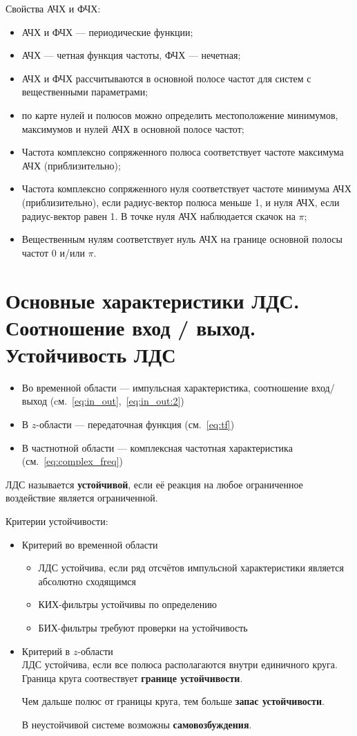 \documentclass[a4paper, 14pt]{extarticle}
\begin{document}
Свойства АЧХ и ФЧХ:
\begin{itemize}
    \item АЧХ и ФЧХ --- периодические функции;
    \item АЧХ --- четная функция частоты, ФЧХ --- нечетная;
    \item АЧХ и ФЧХ рассчитываются в основной полосе частот для систем с вещественными параметрами;
    \item по карте нулей и полюсов можно определить местоположение минимумов, максимумов и нулей АЧХ в основной полосе частот;
    \item Частота комплексно сопряженного полюса соответствует частоте максимума АЧХ (приблизительно);
    \item Частота комплексно сопряженного нуля соответствует частоте минимума АЧХ (приблизительно), если радиус-вектор полюса меньше 1, и нуля АЧХ, если радиус-вектор равен 1. В точке нуля АЧХ наблюдается скачок на $\pi$;
    \item Вещественным нулям соответствует нуль АЧХ на границе основной полосы частот $0$ и/или $\pi$.
\end{itemize}

\section{Основные характеристики ЛДС. Соотношение вход / выход. Устойчивость ЛДС}
\begin{itemize}
    \item Во временной области --- импульсная характеристика, соотношение вход/выход (cм.~\ref{eq:in_out},~\ref{eq:in_out:2})
    \item В $z$-области --- передаточная функция (см.~\ref{eq:tf})
    \item В частнотной области --- комплексная частотная характеристика (см.~\ref{eq:complex_freq})
\end{itemize}

ЛДС называется \textbf{устойчивой}, если её реакция на любое ограниченное воздействие является ограниченной.

Критерии устойчивости:
\begin{itemize}
    \item Критерий во временной области
    \begin{itemize}
        \item ЛДС устойчива, если ряд отсчётов импульсной характеристики является абсолютно сходящимся
        \item КИХ-фильтры устойчивы по определению
        \item БИХ-фильтры требуют проверки на устойчивость
    \end{itemize}
    \item Критерий в $z$-области\\
        ЛДС устойчива, если все полюса располагаются внутри единичного круга. Граница круга соотвествует \textbf{границе устойчивости}.

        Чем дальше полюс от границы круга, тем больше \textbf{запас устойчивости}.

        В неустойчивой системе возможны \textbf{самовозбуждения}.
\end{itemize}
\end{document}
